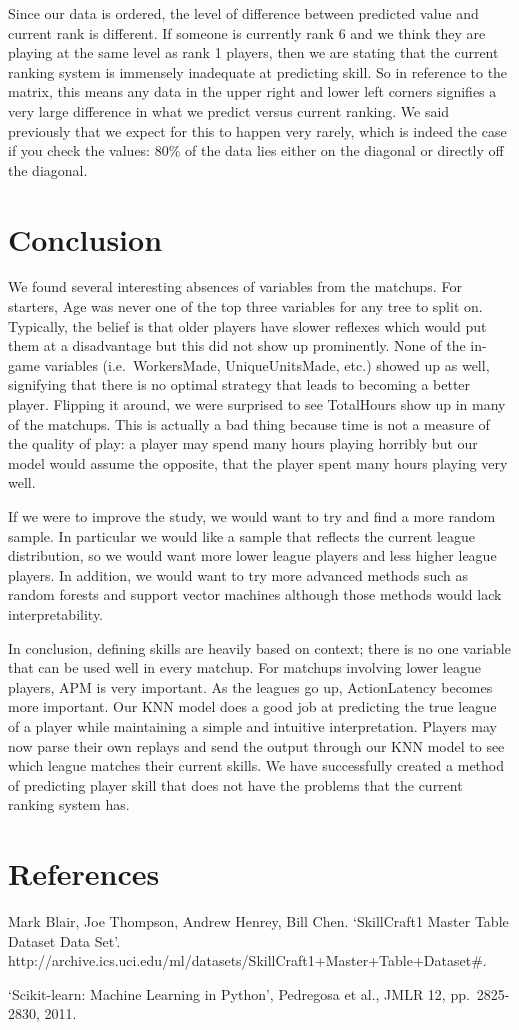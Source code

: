 \documentclass[letterpaper,10pt,english]{/usr/share/sphinx/texinputs/sphinxhowto}
\begin{document}
Since our data is ordered, the level of difference between predicted
value and current rank is different. If someone is currently rank 6 and
we think they are playing at the same level as rank 1 players, then we
are stating that the current ranking system is immensely inadequate at
predicting skill. So in reference to the matrix, this means any data in
the upper right and lower left corners signifies a very large difference
in what we predict versus current ranking. We said previously that we
expect for this to happen very rarely, which is indeed the case if you
check the values: 80\% of the data lies either on the diagonal or
directly off the diagonal.\part{Conclusion}We found several interesting absences of variables from the matchups.
For starters, Age was never one of the top three variables for any tree
to split on. Typically, the belief is that older players have slower
reflexes which would put them at a disadvantage but this did not show up
prominently. None of the in-game variables (i.e.~WorkersMade,
UniqueUnitsMade, etc.) showed up as well, signifying that there is no
optimal strategy that leads to becoming a better player. Flipping it
around, we were surprised to see TotalHours show up in many of the
matchups. This is actually a bad thing because time is not a measure of
the quality of play: a player may spend many hours playing horribly but
our model would assume the opposite, that the player spent many hours
playing very well.

If we were to improve the study, we would want to try and find a more
random sample. In particular we would like a sample that reflects the
current league distribution, so we would want more lower league players
and less higher league players. In addition, we would want to try more
advanced methods such as random forests and support vector machines
although those methods would lack interpretability.

In conclusion, defining skills are heavily based on context; there is no
one variable that can be used well in every matchup. For matchups
involving lower league players, APM is very important. As the leagues go
up, ActionLatency becomes more important. Our KNN model does a good job
at predicting the true league of a player while maintaining a simple and
intuitive interpretation. Players may now parse their own replays and
send the output through our KNN model to see which league matches their
current skills. We have successfully created a method of predicting
player skill that does not have the problems that the current ranking
system has.\part{References}Mark Blair, Joe Thompson, Andrew Henrey, Bill Chen. `SkillCraft1 Master
Table Dataset Data Set'.
http://archive.ics.uci.edu/ml/datasets/SkillCraft1+Master+Table+Dataset\#.

`Scikit-learn: Machine Learning in Python', Pedregosa et al., JMLR 12,
pp.~2825-2830, 2011.
        

        \renewcommand{\indexname}{Index}
        \printindex

    
\end{document}
